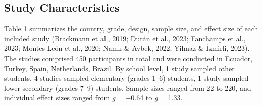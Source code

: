 \documentclass[man,a4paper,12pt,floatsintext,nolmodern,notab]{apa7}
\begin{document}
\subsection{Study Characteristics}
Table 1 summarizes the country, grade, design, sample size, and effect size of each included study (Brackmann et al., 2019; Durán et al., 2023; Fanchamps et al., 2023; Montes-León et al., 2020; Namlı \& Aybek, 2022; Yilmaz \& İzmirli, 2023). The studies comprised 450 participants in total and were conducted in Ecuador, Turkey, Spain, Netherlands, Brazil. By school level, 1 study sampled other students, 4 studies sampled elementary (grades 1–6) students, 1 study sampled lower secondary (grades 7–9) students. Sample sizes ranged from 22 to 220, and individual effect sizes ranged from \textit{g} = \ensuremath{-}0.64 to \textit{g} = 1.33.
\end{document}
